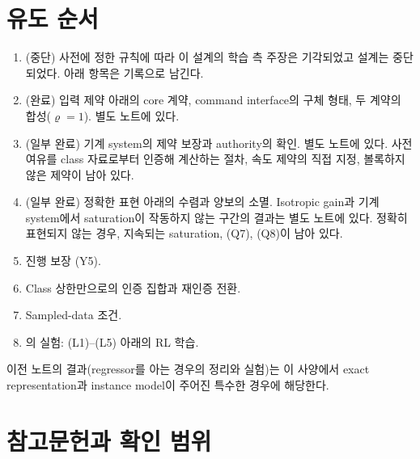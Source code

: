 \documentclass[11pt]{article}\usepackage[margin=1in]{geometry}\usepackage{amsmath,amssymb,amsthm,mathtools}\usepackage{graphicx}\graphicspath{{figures/}{../figures/}{figs/}{./}}\usepackage{enumitem}\usepackage{hyperref}\usepackage{cleveref}\usepackage{tikz}\usetikzlibrary{arrows.meta,positioning,calc,shapes.geometric}\usepackage{float}\usepackage{rotating}\usepackage[most]{tcolorbox}\usepackage{kotex}\usepackage{booktabs}\emergencystretch=1.6em\tolerance=2000 \crefname{assumption}{Assumption}{Assumptions}\Crefname{assumption}{Assumption}{Assumptions}\crefname{definition}{Definition}{Definitions}\Crefname{definition}{Definition}{Definitions}\crefname{proposition}{Proposition}{Propositions}\Crefname{proposition}{Proposition}{Propositions}\crefname{fact}{Fact}{Facts}\Crefname{fact}{Fact}{Facts} \newtheorem{assumption}{Assumption}\newtheorem{definition}{Definition}\newtheorem{lemma}{Lemma}\newtheorem{proposition}{Proposition}\newtheorem{theorem}{Theorem}\newtheorem{corollary}{Corollary}\newtheorem{fact}{Fact}\theoremstyle{remark}\newtheorem{remark}{Remark} \newcommand{\R}{\mathbb{R}}\newcommand{\xb}{\bar x}\newcommand{\Ab}{\bar A}\newcommand{\By}{\bar B_y}\newcommand{\U}{\mathcal U}\newcommand{\Z}{\mathcal Z}
\begin{document}
\section{유도 순서}
\label{sec:roadmap}

\begin{enumerate}
\item (중단) 사전에 정한 규칙에 따라 이 설계의 학습 측 주장은 기각되었고 설계는 중단되었다. 아래 항목은 기록으로 남긴다.
\item (완료) 입력 제약 아래의 core 계약, command interface의 구체 형태, 두 계약의 합성($\varrho=1$). 별도 노트에 있다.
\item (일부 완료) 기계 system의 제약 보장과 authority의 확인. 별도 노트에 있다. 사전 여유를 class 자료로부터 인증해 계산하는 절차, 속도 제약의 직접 지정, 볼록하지 않은 제약이 남아 있다.
\item (일부 완료) 정확한 표현 아래의 수렴과 양보의 소멸. Isotropic gain과 기계 system에서 saturation이 작동하지 않는 구간의 결과는 별도 노트에 있다. 정확히 표현되지 않는 경우, 지속되는 saturation, (Q7), (Q8)이 남아 있다.
\item 진행 보장 (Y5).
\item Class 상한만으로의 인증 집합과 재인증 전환.
\item Sampled-data 조건.
\item {}의 실험: (L1)--(L5) 아래의 RL 학습.
\end{enumerate}
이전 노트의 결과(regressor를 아는 경우의 정리와 실험)는 이 사양에서 exact representation과 instance model이 주어진 특수한 경우에 해당한다.

\appendix

\section{참고문헌과 확인 범위}
\label{app:refs}
\end{document}
